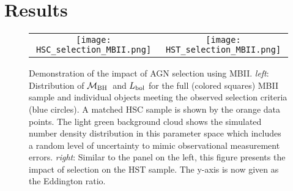 \documentclass[twocolumn]{aastex631}
\def\mbh{$\mathcal M_{\rm BH}$}
\begin{document}
\section{Results} \label{sec:result}
\begin{figure*}
\centering
\begin{tabular}{c c}
{\texttt{[image: HSC\_selection\_MBII.png]}} &
{\texttt{[image: HST\_selection\_MBII.png]}}
\end{tabular}
\caption{\label{fig:selection}Demonstration of the impact of AGN selection using MBII. {\it left}: Distribution of \mbh\ and $L_{\rm bol}$ for the full (colored squares) MBII sample and individual objects meeting the observed selection criteria (blue circles). A matched HSC sample is shown by the orange data points. The light green background cloud shows the simulated number density distribution in this parameter space which includes a random level of uncertainty to mimic observational measurement errors. {\it right}: Similar to the panel on the left, this figure presents the impact of selection on the HST sample. The y-axis is now given as the Eddington ratio.}

\end{figure*}
\end{document}
